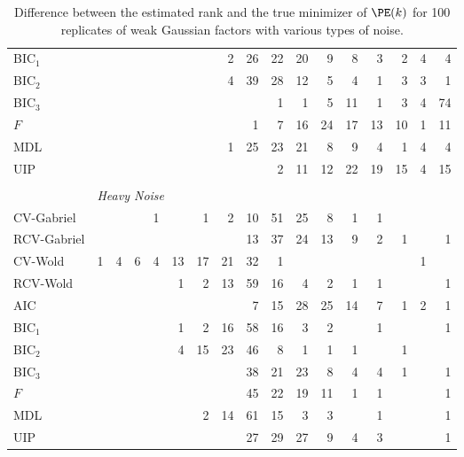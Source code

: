 \begin{table}
\begin{tabular}{lrrrrrrrrrrrrrrrr}
 BIC$_1$ &  &  &  &  &  &  &  2 &  26 &  22 &  20 &  9 &  8 &  3 &  2 &  4 &  4\\ 
 BIC$_2$ &  &  &  &  &  &  &  4 &  39 &  28 &  12 &  5 &  4 &  1 &  3 &  3 &  1\\ 
 BIC$_3$ &  &  &  &  &  &  &  &  &  1 &  1 &  5 &  11 &  1 &  3 &  4 &  74\\ 
 $F$ &  &  &  &  &  &  &  &  1 &  7 &  16 &  24 &  17 &  13 &  10 &  1 &  11\\ 
 MDL &  &  &  &  &  &  &  1 &  25 &  23 &  21 &  8 &  9 &  4 &  1 &  4 &  4\\ 
 UIP &  &  &  &  &  &  &  &  &  2 &  11 &  12 &  22 &  19 &  15 &  4 &  15\\         
        \\
        &\multicolumn{16}{l}{\scriptsize{\textit{Heavy Noise}}} \\
CV-Gabriel &  &  &  &  1 &  &  1 &  2 &  10 &  51 &  25 &  8 &  1 &  1 &  &  & \\ 
 RCV-Gabriel &  &  &  &  &  &  &  &  13 &  37 &  24 &  13 &  9 &  2 &  1 &  &  1\\ 
 CV-Wold &  1 &  4 &  6 &  4 &  13 &  17 &  21 &  32 &  1 &  &  &  &  &  &  1 & \\ 
 RCV-Wold &  &  &  &  &  1 &  2 &  13 &  59 &  16 &  4 &  2 &  1 &  1 &  &  &  1\\ 
 AIC &  &  &  &  &  &  &  &  7 &  15 &  28 &  25 &  14 &  7 &  1 &  2 &  1\\ 
 BIC$_1$ &  &  &  &  &  1 &  2 &  16 &  58 &  16 &  3 &  2 &  &  1 &  &  &  1\\ 
 BIC$_2$ &  &  &  &  &  4 &  15 &  23 &  46 &  8 &  1 &  1 &  1 &  &  1 &  & \\ 
 BIC$_3$ &  &  &  &  &  &  &  &  38 &  21 &  23 &  8 &  4 &  4 &  1 &  &  1\\ 
 $F$ &  &  &  &  &  &  &  &  45 &  22 &  19 &  11 &  1 &  1 &  &  &  1\\ 
 MDL &  &  &  &  &  &  2 &  14 &  61 &  15 &  3 &  3 &  &  1 &  &  &  1\\ 
 UIP &  &  &  &  &  &  &  &  27 &  29 &  27 &  9 &  4 &  3 &  &  &  1\\ 
        \bottomrule
    \end{tabular}
    \caption{
        Difference between the estimated rank and the true minimizer of 
        $\PE(k)$ for 100 replicates of weak Gaussian factors with various
        types of noise.
    }\label{T:rank-est-weak-gauss}
\end{table}


